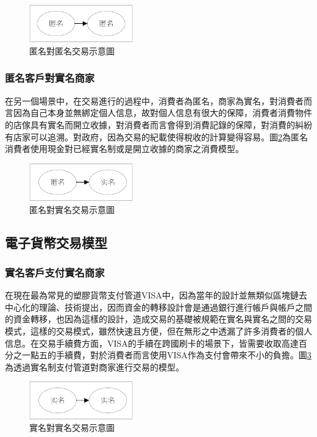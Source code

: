 		\begin{figure}[h]
			\centering
			\includegraphics[width = 0.4\textwidth]{modeaa.png}
			\caption{匿名對匿名交易示意圖}\label{modeaa}
		\end{figure}

		\subsubsection{匿名客戶對實名商家}
		在另一個場景中，在交易進行的過程中，消費者為匿名，商家為實名，對消費者而言因為自己本身並無綁定個人信息，故對個人信息有很大的保障，消費者消費物件的店傢具有實名而開立收據，對消費者而言會得到消費記錄的保障，對消費的糾紛有店家可以追溯。對政府，因為交易的紀載使得稅收的計算變得容易。圖\ref{modean}為匿名消費者使用現金對已經實名制或是開立收據的商家之消費模型。

		\begin{figure}[h]
			\centering
			\includegraphics[width = 0.4\textwidth]{modean.png}
			\caption{匿名對實名交易示意圖}\label{modean}
		\end{figure}

	\subsection{電子貨幣交易模型}

		\subsubsection{實名客戶支付實名商家}
		在現在最為常見的塑膠貨幣支付管道VISA中，因為當年的設計並無類似區塊鏈去中心化的理論、技術提出，因而資金的轉移設計會是通過銀行進行帳戶與帳戶之間的資金轉移，也因為這樣的設計，造成交易的基礎被規範在實名與實名之間的交易模式，這樣的交易模式，雖然快速且方便，但在無形之中透漏了許多消費者的個人信息。在交易手續費方面，VISA的手續在跨國刷卡的場景下，皆需要收取高達百分之一點五的手續費，對於消費者而言使用VISA作為支付會帶來不小的負擔。圖\ref{modenn}為透過實名制支付管道對商家進行交易的模型。

		\begin{figure}[h]
			\centering
			\includegraphics[width = 0.4\textwidth]{modenn.png}
			\caption{實名對實名交易示意圖}\label{modenn}
		\end{figure}

